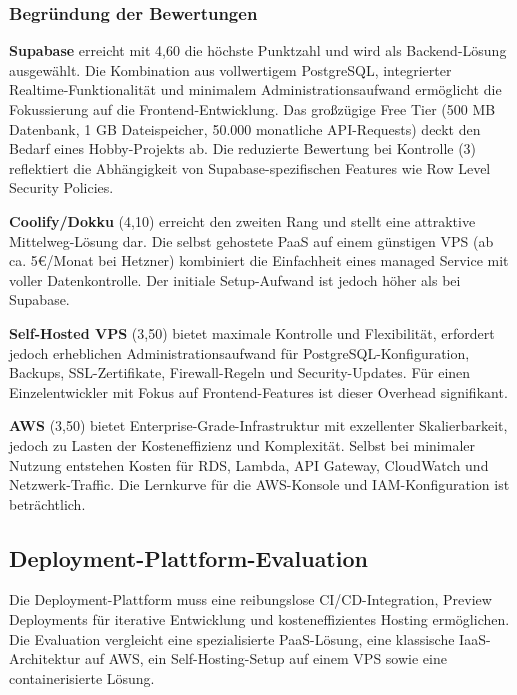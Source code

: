 \subsubsection{Begründung der Bewertungen}

\textbf{Supabase} erreicht mit 4,60 die höchste Punktzahl und wird als Backend-Lösung ausgewählt. Die Kombination aus vollwertigem PostgreSQL, integrierter Realtime-Funktionalität und minimalem Administrationsaufwand ermöglicht die Fokussierung auf die Frontend-Entwicklung. Das großzügige Free Tier (500 MB Datenbank, 1 GB Dateispeicher, 50.000 monatliche API-Requests) deckt den Bedarf eines Hobby-Projekts ab. Die reduzierte Bewertung bei Kontrolle (3) reflektiert die Abhängigkeit von Supabase-spezifischen Features wie Row Level Security Policies.

\textbf{Coolify/Dokku} (4,10) erreicht den zweiten Rang und stellt eine attraktive Mittelweg-Lösung dar. Die selbst gehostete \ac{PaaS} auf einem günstigen VPS (ab ca. 5€/Monat bei Hetzner) kombiniert die Einfachheit eines managed Service mit voller Datenkontrolle. Der initiale Setup-Aufwand ist jedoch höher als bei Supabase.

\textbf{Self-Hosted VPS} (3,50) bietet maximale Kontrolle und Flexibilität, erfordert jedoch erheblichen Administrationsaufwand für PostgreSQL-Konfiguration, Backups, SSL-Zertifikate, Firewall-Regeln und Security-Updates. Für einen Einzelentwickler mit Fokus auf Frontend-Features ist dieser Overhead signifikant.

\textbf{AWS} (3,50) bietet Enterprise-Grade-Infrastruktur mit exzellenter Skalierbarkeit, jedoch zu Lasten der Kosteneffizienz und Komplexität. Selbst bei minimaler Nutzung entstehen Kosten für RDS, Lambda, API Gateway, CloudWatch und Netzwerk-Traffic. Die Lernkurve für die AWS-Konsole und \ac{IAM}-Konfiguration ist beträchtlich.

\subsection{Deployment-Plattform-Evaluation}
\label{sec:deployment-evaluation}

Die Deployment-Plattform muss eine reibungslose \ac{CI}/\ac{CD}-Integration, Preview Deployments für iterative Entwicklung und kosteneffizientes Hosting ermöglichen. Die Evaluation vergleicht eine spezialisierte \ac{PaaS}-Lösung, eine klassische \ac{IaaS}-Architektur auf AWS, ein Self-Hosting-Setup auf einem VPS sowie eine containerisierte Lösung.

